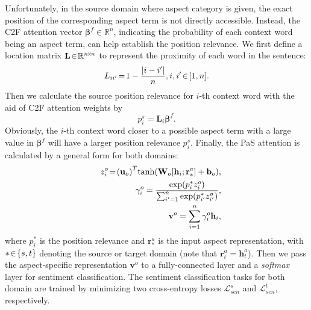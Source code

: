 \documentclass[letterpaper]{article} \usepackage{aaai19}  \usepackage{times}  \usepackage{latexsym}
\begin{document}
Unfortunately, in the source domain where aspect category is given, the exact position of the corresponding aspect term is not directly accessible. Instead, the C2F attention vector ${\bm{ \beta  }}^{f } \!\in\! \mathbb{R}^{n}$, indicating the probability of each context word being an aspect term, can help establish the position relevance. We first define a location matrix $\small{\mathbf{L}\!\in\! \mathbb{R}^{{n}\!\times\!{n}}}$ to represent the proximity of each word in the sentence:
\begin{equation}
{ L }_{ ii'}\!=\!1-\frac { | i-i' |  }{ n }, i,i'\!\in\![1,n].\\
\end{equation}
Then we calculate the source position relevance for $i$-th context word with the aid of C2F attention weights by
\begin{equation}
{ p }^{ s }_{i}=\mathbf{L}_{i}{ \bm{\beta}  }^{f }.
\end{equation}
Obviously, the $i$-th context word closer to a possible aspect term with a large value in ${ \bm{\beta}  }^{ f }$ will have a larger position relevance ${ p }^{ s }_{i}$. Finally, the PaS attention is calculated by a general form for both domains: 
\begin{eqnarray}
&&\small{{ z }_{ i }^{ o }\!=\!{ ({ \mathbf{u} }_o) }^{ T }\mathrm{tanh}({ { { { { \mathbf{W} } } } }_o }[{ \mathbf{h} }_{ i };{ { { \mathbf{r}^{a}_{*} } }}]+{ { \mathbf{b} } }_o)},\\ 
&&\small{{ \gamma   }_{ i }^{ o }=\frac { { \exp }({ p }_{ i }^{*}{ z }_{ i}^{  o }) }{ \sum _{ i'=1 }^{ n }{ { \exp }({ p }_{ i'}^{*}{ z }_{i' }^{ o }) }  } },\\
&&\small{{ {\mathbf{v}}^{o} }=\sum _{ i=1 }^{ n }{ {  \gamma  }_{ i }^{ o }{\mathbf{h} }_{ i } }},
\end{eqnarray}
where ${ p }_{ i }^{*}$ is the position relevance and ${ \mathbf{r}^{a}_{*} }$ is the input aspect representation, with $\small{*\!\in\!\{s,t\}}$ denoting the source or target domain (note that ${ \mathbf{r}^{a}_{t} }=\mathbf{h}^{a}_{t}$). Then we pass the aspect-specific representation $\mathbf{v}^{o}$ to a fully-connected layer and a {\it softmax} layer for sentiment classification. The sentiment classification tasks for both domain are trained by minimizing two cross-entropy losses $\mathcal{L}_{sen}^{s}$ and $\mathcal{L}_{sen}^{t}$, respectively.
\end{document}
